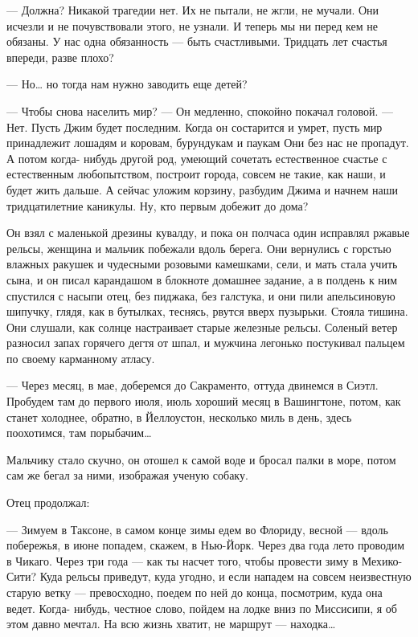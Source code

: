 — Должна? Никакой трагедии нет. Их не пытали, не жгли, не мучали. Они исчезли и
не почувствовали этого, не узнали. И теперь мы ни перед кем не обязаны. У нас
одна обязанность — быть счастливыми. Тридцать лет счастья впереди, разве плохо?

— Но… но тогда нам нужно заводить еще детей?

— Чтобы снова населить мир? — Он медленно, спокойно покачал головой. — Нет.
Пусть Джим будет последним. Когда он состарится и умрет, пусть мир принадлежит
лошадям и коровам, бурундукам и паукам Они без нас не пропадут. А потом когда-
нибудь другой род, умеющий сочетать естественное счастье с естественным
любопытством, построит города, совсем не такие, как наши, и будет жить дальше.
А сейчас уложим корзину, разбудим Джима и начнем наши тридцатилетние каникулы.
Ну, кто первым добежит до дома?

Он взял с маленькой дрезины кувалду, и пока он полчаса один исправлял ржавые
рельсы, женщина и мальчик побежали вдоль берега. Они вернулись с горстью
влажных ракушек и чудесными розовыми камешками, сели, и мать стала учить сына,
и он писал карандашом в блокноте домашнее задание, а в полдень к ним спустился
с насыпи отец, без пиджака, без галстука, и они пили апельсиновую шипучку,
глядя, как в бутылках, теснясь, рвутся вверх пузырьки. Стояла тишина. Они
слушали, как солнце настраивает старые железные рельсы. Соленый ветер разносил
запах горячего дегтя от шпал, и мужчина легонько постукивал пальцем по своему
карманному атласу.

— Через месяц, в мае, доберемся до Сакраменто, оттуда двинемся в Сиэтл.
Пробудем там до первого июля, июль хороший месяц в Вашингтоне, потом, как
станет холоднее, обратно, в Йеллоустон, несколько миль в день, здесь
поохотимся, там порыбачим…

Мальчику стало скучно, он отошел к самой воде и бросал палки в море, потом сам
же бегал за ними, изображая ученую собаку.

Отец продолжал:

— Зимуем в Таксоне, в самом конце зимы едем во Флориду, весной — вдоль
побережья, в июне попадем, скажем, в Нью-Йорк. Через два года лето проводим в
Чикаго. Через три года — как ты насчет того, чтобы провести зиму в Мехико-Сити?
Куда рельсы приведут, куда угодно, и если нападем на совсем неизвестную старую
ветку — превосходно, поедем по ней до конца, посмотрим, куда она ведет. Когда-
нибудь, честное слово, пойдем на лодке вниз по Миссисипи, я об этом давно
мечтал. На всю жизнь хватит, не маршрут — находка…


